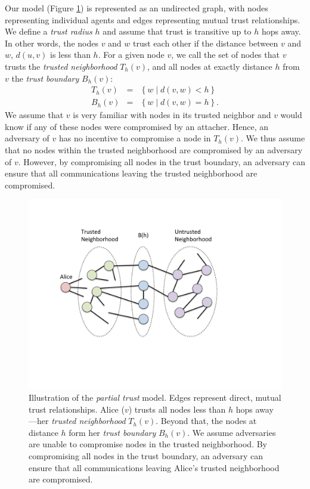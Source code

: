 \documentclass[prodmode,permissions]{acmsmall-ec16}
\newcommand{\beq}{\begin{eqnarray}}
\newcommand{\eeq}{\end{eqnarray}}
\begin{document}
Our model (Figure \ref{fig:trust-source})
is represented as an undirected graph,
with nodes representing individual
agents and edges representing mutual trust relationships.
We define a {\em trust radius} $h$ and assume that trust is transitive
up to $h$ hops away.
In other words, the nodes $v$ and $w$ trust each other if the distance between $v$ and $w$, $d(u,v)$ is less than $h$.
For a given node $v$, we call the set of nodes that $v$ trusts the {\em trusted neighborhood} $T_h(v)$,
and all nodes at exactly distance $h$ from $v$ the {\em trust boundary} $B_h(v)$:
\beq
T_h(v) &=& \left\{ w \mid d(v,w) < h \right\} \\
B_h(v) &=& \left\{ w \mid d(v,w) = h \right\}.
\eeq
We assume that $v$ is very familiar with nodes in its trusted neighbor and $v$ would know if any of these nodes were compromised by an attacher. Hence, an adversary of $v$ has no incentive to compromise a node in  $T_h(v)$. We thus assume that no nodes within the trusted neighborhood are compromised
by an adversary of $v$. However, by compromising all nodes in the trust boundary, an adversary can
ensure that all communications leaving the trusted neighborhood are compromised. 

\begin{figure}
\centerline{\includegraphics[height =.4 \textwidth]{fig-alice_trusted_neigh2}}
\caption{
Illustration of the {\em partial trust} model.
Edges represent direct, mutual trust relationships.
Alice ($v$) trusts all nodes less than
$h$ hops away---her {\em trusted neighborhood} $T_h(v)$.
Beyond that, the nodes at distance $h$ form her {\em trust boundary} $B_h(v)$.
We assume adversaries are unable to compromise nodes in the trusted neighborhood.
By compromising all nodes in the trust boundary, an adversary can ensure that
all communications leaving Alice's trusted neighborhood are compromised.
}
\label{fig:trust-source}
\end{figure}
\end{document}
